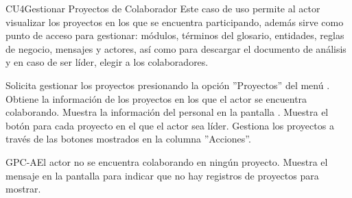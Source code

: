	\begin{UseCase}{CU4}{Gestionar Proyectos de Colaborador}{
		Este caso de uso permite al actor visualizar los proyectos en los que se encuentra participando, además sirve como punto de acceso para gestionar: módulos, términos del glosario, entidades, reglas de negocio, mensajes y actores, así como para descargar el documento de análisis y en caso de ser líder, elegir a los colaboradores.
	}
\end{UseCase}
\begin{UCtrayectoria}
	\UCpaso[\UCactor] Solicita gestionar los proyectos presionando la opción ''Proyectos'' del menú .
	\UCpaso[\UCsist] Obtiene la información de los proyectos en los que el actor se encuentra colaborando. 
	\UCpaso[\UCsist] Muestra la información del personal en la pantalla .
	\UCpaso[\UCsist] Muestra el botón  para cada proyecto en el que el actor sea líder.
	\UCpaso[\UCactor] Gestiona los proyectos a través de las botones mostrados en la columna ''Acciones''. \label{CU4-P5}
\end{UCtrayectoria}		
\begin{UCtrayectoriaA}{GPC-A}{El actor no se encuentra colaborando en ningún proyecto.}
	\UCpaso[\UCsist] Muestra el mensaje  en la pantalla  para indicar que no hay registros de proyectos para mostrar.
\end{UCtrayectoriaA}

